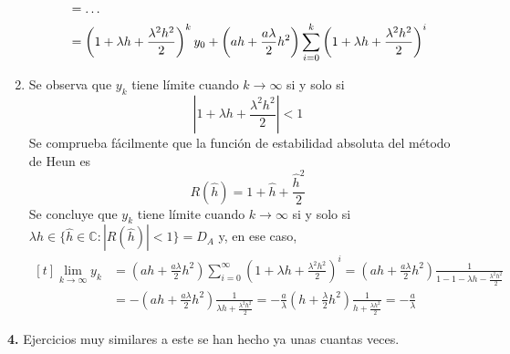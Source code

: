 \documentclass[11pt]{report}
\newcommand{\C}{\mathbb C}
\begin{document}
\begin{enumerate}
\[\begin{aligned}[t]
    &= \mathellipsis \\
    &=  \left(1+\lambda h +\frac{\lambda^2h^2}{2}\right)^ky_{0}+ \left(ah+\frac{a\lambda}{2}h^2\right)\sum_{i=0}^k\left(1+\lambda h +\frac{\lambda^2h^2}{2}\right)^i
\end{aligned}
\]
\item Se observa que $y_k$ tiene límite cuando $k \to \infty$ si y solo si
\[\left|1+\lambda h+\frac{\lambda^2h^2}{2}\right| < 1\]
Se comprueba fácilmente que la función de estabilidad absoluta del método de Heun es 
\[R(\hat{h}) = 1+\hat{h}+\frac{\hat{h}^2}{2}\]
Se concluye que $y_k$ tiene límite cuando $k \to \infty$ si y solo si $\lambda h \in \{\hat{h} \in \C \colon |R(\hat{h})| < 1\} = D_A$ y, en ese caso,
\[
\begin{aligned}[t]
\lim_{k \to \infty} y_k &=  \left(ah+\frac{a\lambda}{2}h^2\right)\sum_{i=0}^\infty\left(1+\lambda h +\frac{\lambda^2h^2}{2}\right)^i = \left(ah+\frac{a\lambda}{2}h^2\right) \frac{1}{1-1-\lambda h -\frac{\lambda^2h^2}{2}} \\
&= -\left(ah+\frac{a\lambda}{2}h^2\right) \frac{1}{\lambda h +\frac{\lambda^2h^2}{2}} = -\frac{a}{\lambda}\left(h+\frac{\lambda}{2}h^2\right) \frac{1}{ h +\frac{\lambda h^2}{2}} = -\frac{a}{\lambda}
\end{aligned}
\]
\end{enumerate}

\textbf{4. } Ejercicios muy similares a este se han hecho ya unas cuantas veces.
\end{document}
